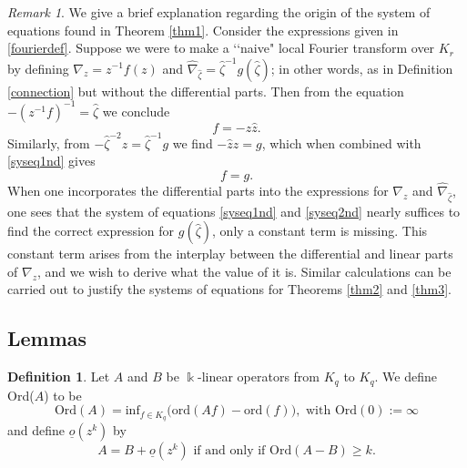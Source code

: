 \documentclass[11pt]{amsart}
\theoremstyle{theorem}
\theoremstyle{lemma}
\theoremstyle{corollary}
\theoremstyle{proposition}
\theoremstyle{definition}
\newtheorem{definition}{Definition}
\theoremstyle{remark}
\newtheorem*{remark}{Remark}
\def\d{\displaystyle}
\def\z{\hat{\zeta}}
\begin{document}
\begin{remark} We give a brief explanation regarding the origin of the system of equations found in Theorem \ref{thm1}.  Consider the expressions given in \eqref{fourierdef}.  Suppose we were to make a \lq\lq naive" local Fourier transform over $K_r$ by defining $\nabla_z=z^{-1}f(z)$ and $\hat{\nabla}_{\z}=\z^{-1}g(\z)$; in other words, as in Definition \ref{connection} but without the differential parts.  Then from the equation $-(z^{-1}f)^{-1}=\z$ we conclude
\begin{equation}\label{syseq1nd}
f=-z\hat{z}.
\end{equation}Similarly, from $-\z^{-2}z=\z^{-1}g$ we find
$-\hat{z} z=g$, which when combined with \eqref{syseq1nd} gives
\begin{equation}\label{syseq2nd}
f=g.
\end{equation}When one incorporates the differential parts into the expressions for $\nabla_{z}$ and $\hat{\nabla}_{\z}$, one sees that the system of equations \eqref{syseq1nd} and \eqref{syseq2nd} nearly suffices to find the correct expression for $g(\z)$, only a constant term is missing.  This constant term arises from the interplay between the differential and linear parts of $\nabla_{z}$, and we wish to derive what the value of it is.  Similar calculations can be carried out to justify the systems of equations for Theorems \ref{thm2} and \ref{thm3}.
\end{remark}

\subsection{Lemmas}

 \begin{definition} Let $A$ and $B$ be $\Bbbk$-linear operators from $K_q$ to $K_q$.
We define Ord($A$) to be $$\d{\text{Ord}(A)=\text{inf}_{f\in K_q}\big(\text{ord}(Af)-\text{ord}(f)\big), \text{ with Ord}(0):=\infty}$$ and define $\underline{o}(z^k)$ by $$A=B+\underline{o}(z^k) \text{  if and only if  } \text{Ord}(A-B)\geq k.$$
\end{definition}
\end{document}
